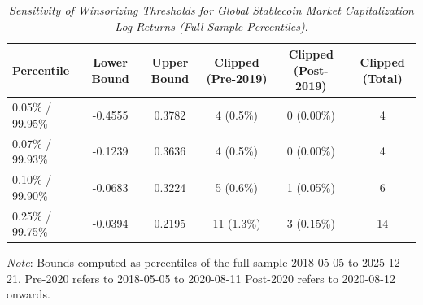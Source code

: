 \begin{table}[h]
  \centering
  \caption{\textit{Sensitivity of Winsorizing Thresholds for Global Stablecoin Market Capitalization Log Returns (Full-Sample Percentiles)}.}
  \label{tab:winsorstablecoin20182025}
  \begin{tabular}{lccccc}
    \toprule
    \textbf{Percentile} & \textbf{Lower Bound} & \textbf{Upper Bound} & \textbf{Clipped (Pre-2019)} & \textbf{Clipped (Post-2019)} & \textbf{Clipped (Total)} \\ 
    \midrule
    0.05\% / 99.95\% & -0.4555 & 0.3782 & 4 (0.5\%) & 0 (0.00\%) & 4 \\ 
    0.07\% / 99.93\% & -0.1239 & 0.3636 & 4 (0.5\%) & 0 (0.00\%) & 4 \\ 
    0.10\% / 99.90\% & -0.0683 & 0.3224 & 5 (0.6\%) & 1 (0.05\%) & 6 \\ 
    0.25\% / 99.75\% & -0.0394 & 0.2195 & 11 (1.3\%) & 3 (0.15\%) & 14 \\ 
    \bottomrule
  \end{tabular}
  \vspace{2pt}
  \footnotesize{\textit{Note}: Bounds computed as percentiles of the full sample 2018-05-05 to 2025-12-21. Pre-2020 refers to 2018-05-05 to 2020-08-11 Post-2020 refers to 2020-08-12 onwards.}\\
\end{table}